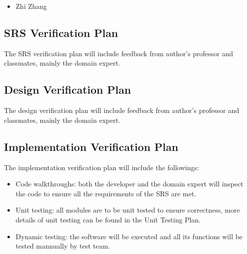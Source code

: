 \documentclass[12pt, titlepage]{article}
\begin{document}
\begin{itemize}
    \item Zhi Zhang
\end{itemize}


\subsection{SRS Verification Plan}

The SRS verification plan will include feedback from author's professor and
classmates, mainly the domain expert.  

\subsection{Design Verification Plan}

The design verification plan will include feedback from author's professor and
classmates, mainly the domain expert.


\subsection{Implementation Verification Plan}

The implementation verification plan will include the followings:
\begin{itemize}
    \item Code walkthroughs: both the developer and the domain expert will
inspect the code to ensure all the requirements of the SRS are met. 
    \item Unit testing: all modules are to be unit tested to ensure correctness,
more details of unit testing can be found in the Unit Testing Plan. 
    \item Dynamic testing: the software will be executed and all its functions
will be tested mannually by test team.
\end{itemize}
\end{document}
